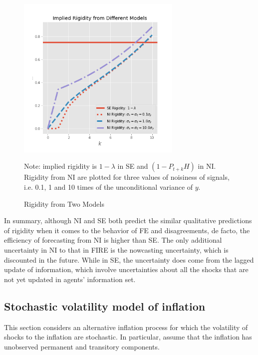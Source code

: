 \documentclass[12pt]{article}
\begin{document}
	\begin{figure}[p]
		\centering
		\includegraphics[width=0.7\textwidth]{figures/rigidity.png} 
		\begin{flushleft}
			{\footnotesize Note: implied rigidity is $1-\lambda$ in SE and $(1-P_{t+k}H)$ in NI. Rigidity from NI are plotted for three values of noisiness of signals, i.e. 0.1, 1 and 10 times of the unconditional variance of $y$. }
		\end{flushleft}
		\caption{Rigidity from Two Models}
		\label{rigidity}
	\end{figure}
	
	In summary, although NI and SE both predict the similar qualitative predictions of rigidity when it comes to the behavior of FE and disagreements, de facto, the efficiency of forecasting from NI is higher than SE. The only additional uncertainty in NI to that in FIRE is the nowcasting uncertainty, which is discounted in the future. While in SE, the uncertainty does come from the lagged update of information, which involve uncertainties about all the shocks that are not yet updated in agents' information set. 
		
		
	
	\subsection{Stochastic volatility model of inflation}
	
	This section considers an alternative inflation process for which the volatility of shocks to the inflation are stochastic. In particular, assume that the inflation has unobserved permanent and transitory components. 
		
\end{document}
